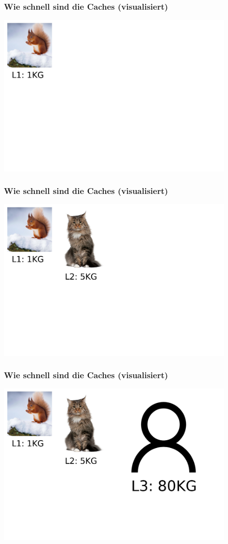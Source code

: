 \documentclass{beamer}
\begin{document}
\begin{frame}
\frametitle{Wie schnell sind die Caches (visualisiert)}
\centerline{\includegraphics[width=12cm]{sizes1.png}}
\end{frame}

\begin{frame}
\frametitle{Wie schnell sind die Caches (visualisiert)}
\centerline{\includegraphics[width=12cm]{sizes2.png}}
\end{frame}

\begin{frame}
\frametitle{Wie schnell sind die Caches (visualisiert)}
\centerline{\includegraphics[width=12cm]{sizes3.png}}
\end{frame}
\end{document}
